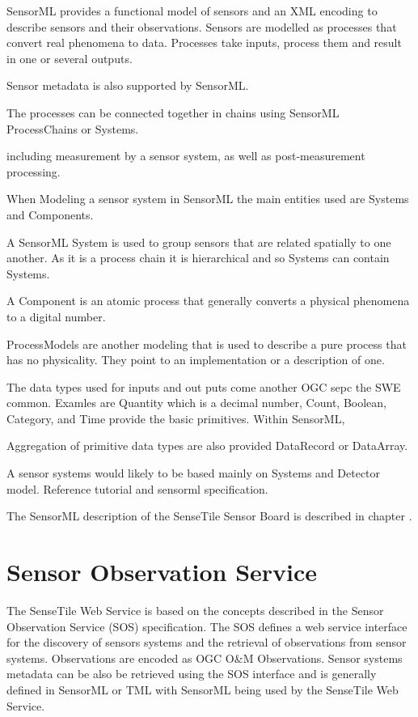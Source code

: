 \documentclass[]{final_report}
\begin{document}
SensorML provides a functional model of sensors and an XML encoding to describe sensors and their observations.
Sensors are modelled as processes that convert real phenomena to data. Processes take inputs, process them and result in one or several outputs.

Sensor metadata is also supported by SensorML.  

The processes can be connected together in chains using SensorML ProcessChains or Systems. 

including measurement by a sensor system, as well as post-measurement
processing.

When Modeling a sensor system in SensorML the main entities used are Systems and Components. 

A SensorML System is used to group sensors that are related spatially to one another.  As it is a process chain it is hierarchical and so Systems can contain Systems.

A Component is an atomic process that generally converts a physical phenomena to a digital number. 

ProcessModels are another modeling that is used to describe a pure process that has no physicality. They point to an implementation or a description of one.

The data types used for inputs and out puts come another OGC sepc the SWE common. Examles are Quantity which is a decimal number, Count, Boolean, Category, and Time provide the basic primitives. Within SensorML, 

Aggregation of primitive data types are also provided DataRecord or DataArray.

A sensor systems would likely to be based mainly on Systems and
Detector model. Reference tutorial and sensorml specification.

The SensorML description of the SenseTile Sensor Board is described in chapter .

\section{Sensor Observation Service}
The SenseTile Web Service is based on the concepts described in the Sensor Observation Service (SOS) specification. The SOS defines a web service interface for the discovery of sensors systems and the retrieval of observations from sensor systems.  Observations are encoded as OGC O\&M Observations. Sensor systems metadata can be also be retrieved using the SOS interface and is generally defined in SensorML or TML with SensorML being used by the SenseTile Web Service.
\end{document}
